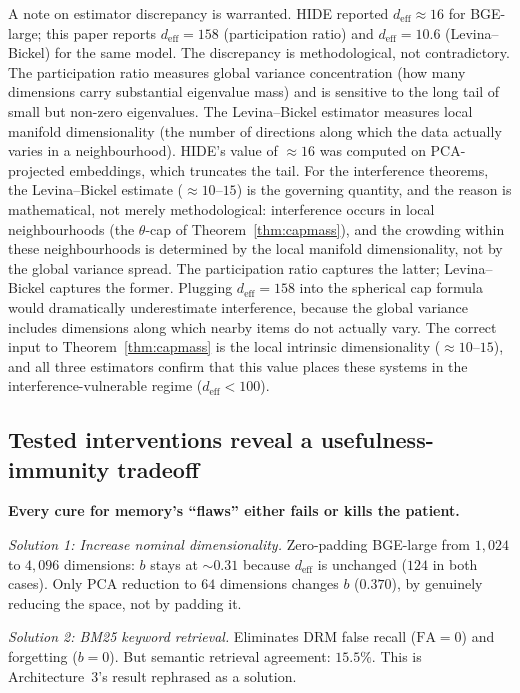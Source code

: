 \documentclass[11pt]{article}
\begin{document}
A note on estimator discrepancy is warranted. HIDE reported $d_\text{eff} \approx 16$ for BGE-large; this paper reports $d_\text{eff} = 158$ (participation ratio) and $d_\text{eff} = 10.6$ (Levina--Bickel) for the same model. The discrepancy is methodological, not contradictory. The participation ratio measures global variance concentration (how many dimensions carry substantial eigenvalue mass) and is sensitive to the long tail of small but non-zero eigenvalues. The Levina--Bickel estimator measures local manifold dimensionality (the number of directions along which the data actually varies in a neighbourhood). HIDE's value of $\approx 16$ was computed on PCA-projected embeddings, which truncates the tail. For the interference theorems, the Levina--Bickel estimate ($\approx 10$--$15$) is the governing quantity, and the reason is mathematical, not merely methodological: interference occurs in local neighbourhoods (the $\theta$-cap of Theorem~\ref{thm:capmass}), and the crowding within these neighbourhoods is determined by the local manifold dimensionality, not by the global variance spread. The participation ratio captures the latter; Levina--Bickel captures the former. Plugging $d_\text{eff} = 158$ into the spherical cap formula would dramatically underestimate interference, because the global variance includes dimensions along which nearby items do not actually vary. The correct input to Theorem~\ref{thm:capmass} is the local intrinsic dimensionality ($\approx 10$--$15$), and all three estimators confirm that this value places these systems in the interference-vulnerable regime ($d_\text{eff} < 100$).

\subsection*{Tested interventions reveal a usefulness-immunity tradeoff}

\noindent\textbf{Every cure for memory's ``flaws'' either fails or kills the patient.}\quad

\textit{Solution 1: Increase nominal dimensionality.} Zero-padding BGE-large from $1{,}024$ to $4{,}096$ dimensions: $b$ stays at ${\sim}0.31$ because $d_\text{eff}$ is unchanged ($124$ in both cases). Only PCA reduction to $64$ dimensions changes $b$ ($0.370$), by genuinely reducing the space, not by padding it.

\textit{Solution 2: BM25 keyword retrieval.} Eliminates DRM false recall ($\text{FA} = 0$) and forgetting ($b = 0$). But semantic retrieval agreement: $15.5\%$. This is Architecture~3's result rephrased as a solution.
\end{document}
